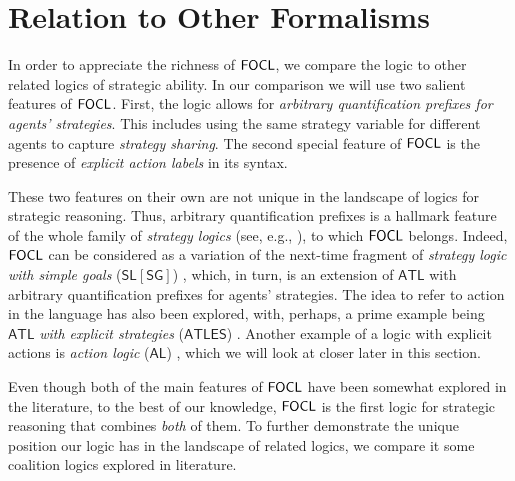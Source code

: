 \documentclass{article}
\theoremstyle{definition}
\begin{document}
   

\section{Relation to Other Formalisms}
In order to appreciate the richness of $\mathsf{FOCL}$, we compare the logic to other related logics of strategic ability. In our comparison we will use two salient features of $\mathsf{FOCL}$. First, the logic allows for \textit{arbitrary quantification prefixes for agents' strategies}. This includes using the same strategy variable for different agents to capture \textit{strategy sharing}. The second special feature of $\mathsf{FOCL}$ is the presence of \textit{explicit action labels} in its syntax.

These two features on their own are not unique in the landscape of logics for strategic reasoning. Thus, arbitrary quantification prefixes is a hallmark feature of the whole family of \textit{strategy logics} (see, e.g., \cite{mogavero10,belardinelli19}), to which $\mathsf{FOCL}$ belongs. Indeed, $\mathsf{FOCL}$ can be considered as a variation of the next-time fragment of \textit{strategy logic with simple goals} ($\mathsf{SL[SG]}$) \cite{belardinelli19}, which, in turn, is an extension of $\mathsf{ATL}$ \cite{alur02} with arbitrary quantification prefixes for agents' strategies. The idea to refer to action in the language has also been explored, with, perhaps, a prime example being $\mathsf{ATL}$ \textit{with explicit strategies} ($\mathsf{ATLES}$) \cite{walther07}. Another example of a logic with explicit actions is \textit{action logic} ($\mathsf{AL}$) \cite{borgo07}, which we will look at closer later in this section.

Even though both of the main features of $\mathsf{FOCL}$ have been somewhat explored in the literature, to the best of our knowledge, $\mathsf{FOCL}$ is the first logic for strategic reasoning that combines \textit{both} of them. To further demonstrate the unique position our logic has in the landscape of related logics, we compare it some coalition logics explored in literature. 


\end{document}

